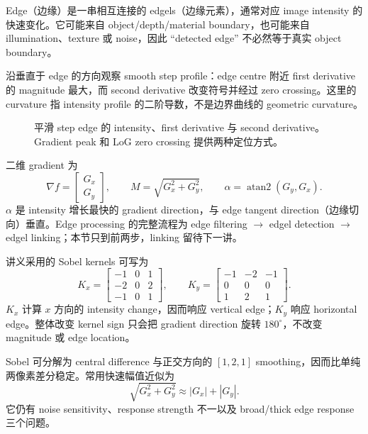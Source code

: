 
Edge（边缘）是一串相互连接的 edgels（边缘元素），通常对应 image intensity 的快速变化。它可能来自 object/depth/material boundary，也可能来自 illumination、texture 或 noise，因此 ``detected edge'' 不必然等于真实 object boundary。

沿垂直于 edge 的方向观察 smooth step profile：edge centre 附近 first derivative 的 magnitude 最大，而 second derivative 改变符号并经过 zero crossing。这里的 curvature 指 intensity profile 的二阶导数，不是边界曲线的 geometric curvature。

\begin{figure}[htbp]
  \centering
  \resizebox{0.98\textwidth}{!}{}
  \caption{平滑 step edge 的 intensity、first derivative 与 second derivative。Gradient peak 和 LoG zero crossing 提供两种定位方式。}
  \label{fig:sc4061-l05-edge-profiles}
\end{figure}

二维 gradient 为
\[
  \nabla f=\begin{bmatrix}G_x\\G_y\end{bmatrix},\qquad
  M=\sqrt{G_x^2+G_y^2},\qquad
  \alpha=\operatorname{atan2}(G_y,G_x).
\]
$\alpha$ 是 intensity 增长最快的 gradient direction，与 edge tangent direction（边缘切向）垂直。Edge processing 的完整流程为 edge filtering $\rightarrow$ edgel detection $\rightarrow$ edgel linking；本节只到前两步，linking 留待下一讲。


讲义采用的 Sobel kernels 可写为
\[
  K_x=\begin{bmatrix}-1&0&1\\-2&0&2\\-1&0&1\end{bmatrix},\qquad
  K_y=\begin{bmatrix}-1&-2&-1\\0&0&0\\1&2&1\end{bmatrix}.
\]
$K_x$ 计算 $x$ 方向的 intensity change，因而响应 vertical edge；$K_y$ 响应 horizontal edge。整体改变 kernel sign 只会把 gradient direction 旋转 $180^\circ$，不改变 magnitude 或 edge location。

Sobel 可分解为 central difference 与正交方向的 $[1,2,1]$ smoothing，因而比单纯两像素差分稳定。常用快速幅值近似为
\[
  \sqrt{G_x^2+G_y^2}\approx |G_x|+|G_y|.
\]
它仍有 noise sensitivity、response strength 不一以及 broad/thick edge response 三个问题。

